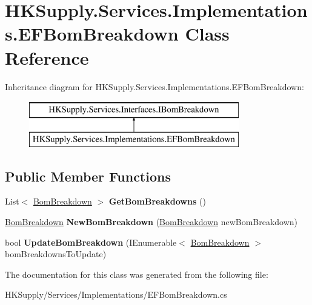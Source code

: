 \hypertarget{class_h_k_supply_1_1_services_1_1_implementations_1_1_e_f_bom_breakdown}{}\section{H\+K\+Supply.\+Services.\+Implementations.\+E\+F\+Bom\+Breakdown Class Reference}
\label{class_h_k_supply_1_1_services_1_1_implementations_1_1_e_f_bom_breakdown}
Inheritance diagram for H\+K\+Supply.\+Services.\+Implementations.\+E\+F\+Bom\+Breakdown\+:\begin{figure}[H]
\begin{center}
\leavevmode
\includegraphics[height=2.000000cm]{class_h_k_supply_1_1_services_1_1_implementations_1_1_e_f_bom_breakdown}
\end{center}
\end{figure}
\subsection*{Public Member Functions}
\begin{DoxyCompactItemize}
\item 
\mbox{\label{class_h_k_supply_1_1_services_1_1_implementations_1_1_e_f_bom_breakdown_a879e134406f17d0d731c873131fbb6ae}} 
List$<$ \mbox{\hyperlink{class_h_k_supply_1_1_models_1_1_bom_breakdown}{Bom\+Breakdown}} $>$ {\bfseries Get\+Bom\+Breakdowns} ()
\item 
\mbox{\label{class_h_k_supply_1_1_services_1_1_implementations_1_1_e_f_bom_breakdown_a34e4ecf935fc9a549311c5fb3e1bc170}} 
\mbox{\hyperlink{class_h_k_supply_1_1_models_1_1_bom_breakdown}{Bom\+Breakdown}} {\bfseries New\+Bom\+Breakdown} (\mbox{\hyperlink{class_h_k_supply_1_1_models_1_1_bom_breakdown}{Bom\+Breakdown}} new\+Bom\+Breakdown)
\item 
\mbox{\label{class_h_k_supply_1_1_services_1_1_implementations_1_1_e_f_bom_breakdown_a58822a650cac7479c81e8c32591584a0}} 
bool {\bfseries Update\+Bom\+Breakdown} (I\+Enumerable$<$ \mbox{\hyperlink{class_h_k_supply_1_1_models_1_1_bom_breakdown}{Bom\+Breakdown}} $>$ bom\+Breakdowns\+To\+Update)
\end{DoxyCompactItemize}


The documentation for this class was generated from the following file\+:\begin{DoxyCompactItemize}
\item 
H\+K\+Supply/\+Services/\+Implementations/E\+F\+Bom\+Breakdown.\+cs\end{DoxyCompactItemize}
